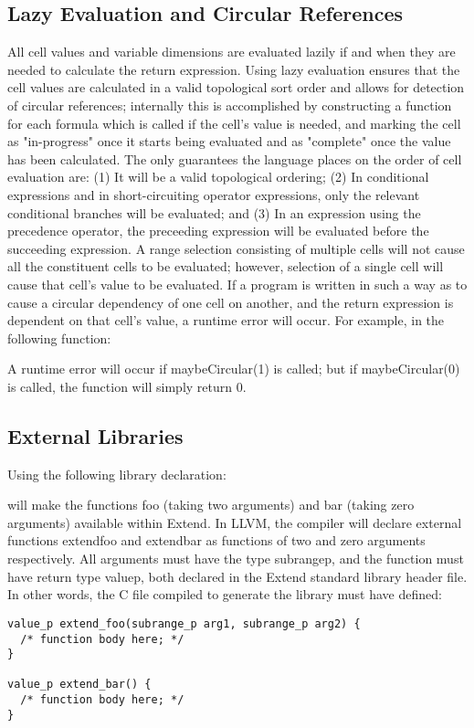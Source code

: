 \subsection{Lazy Evaluation and Circular References}
All cell values and variable dimensions are evaluated lazily if and when they are needed to calculate the return expression. Using lazy evaluation ensures that the cell values are calculated in a valid topological sort order and allows for detection of circular references; internally this is accomplished by constructing a function for each formula which is called if the cell's value is needed, and marking the cell as "in-progress" once it starts being evaluated and as "complete" once the value has been calculated. The only guarantees the language places on the order of cell evaluation are: (1) It will be a valid topological ordering; (2) In conditional expressions and in short-circuiting operator expressions, only the relevant conditional branches will be evaluated; and (3) In an expression using the precedence operator, the preceeding expression will be evaluated before the succeeding expression. A range selection consisting of multiple cells will not cause all the constituent cells to be evaluated; however, selection of a single cell will cause that cell's value to be evaluated.
If a program is written in such a way as to cause a circular dependency of one cell on another, and the return expression is dependent on that cell's value, a runtime error will occur. For example, in the following function:

A runtime error will occur if maybeCircular(1) is called; but if maybeCircular(0) is called, the function will simply return 0.
\subsection{External Libraries}
\label{sec:ExternFunctionSignatures}
Using the following library declaration:

will make the functions foo (taking two arguments) and bar (taking zero arguments) available within Extend. In LLVM, the compiler will declare external functions extend\textunderscore foo and extend\textunderscore bar as functions of two and zero arguments respectively. All arguments must have the type subrange\textunderscore p, and the function must have return type value\textunderscore p, both declared in the Extend standard library header file. In other words, the C file compiled to generate the library must have defined:
\begin{lstlisting}
value_p extend_foo(subrange_p arg1, subrange_p arg2) {
  /* function body here; */
}

value_p extend_bar() {
  /* function body here; */
}
\end{lstlisting}
